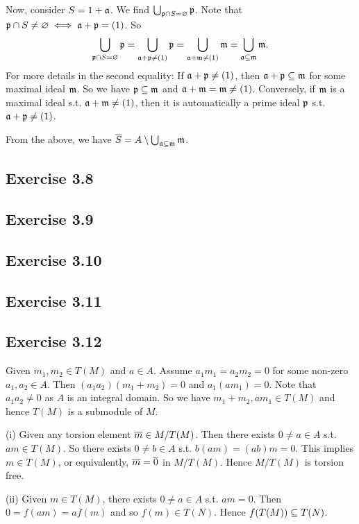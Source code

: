 \documentclass[../A&M.tex]{subfiles}
\begin{document}
Now, consider $S=1+\mathfrak{a}$. We find $\bigcup_{\mathfrak{p}\cap S=\varnothing} \mathfrak{p}$. Note that $\mathfrak{p} \cap S \neq \varnothing \iff \mathfrak{a}+\mathfrak{p}=(1)$. So
$$
\bigcup_{\mathfrak{p}\cap S=\varnothing} \mathfrak{p}
= \bigcup_{\mathfrak{a} + \mathfrak{p} \neq (1)} \mathfrak{p}
= \bigcup_{\mathfrak{a} + \mathfrak{m} \neq (1)} \mathfrak{m}
= \bigcup_{\mathfrak{a}\subseteq\mathfrak{m}} \mathfrak{m}.
$$
For more details in the second equality: If $\mathfrak{a} + \mathfrak{p} \neq (1)$, then $\mathfrak{a} + \mathfrak{p} \subseteq \mathfrak{m}$ for some maximal ideal $\mathfrak{m}$. So we have $\mathfrak{p} \subseteq \mathfrak{m}$ and $\mathfrak{a}+\mathfrak{m} = \mathfrak{m} \neq(1)$. Conversely, if $\mathfrak{m}$ is a maximal ideal s.t. $\mathfrak{a} + \mathfrak{m} \neq (1)$, then it is automatically a prime ideal $\mathfrak{p}$ s.t. $\mathfrak{a} + \mathfrak{p} \neq (1)$.

From the above, we have $\overline{S}=A \setminus \bigcup_{\mathfrak{a}\subseteq\mathfrak{m}} \mathfrak{m}$.

\subsection*{Exercise 3.8}

\subsection*{Exercise 3.9}

\subsection*{Exercise 3.10}

\subsection*{Exercise 3.11}

\subsection*{Exercise 3.12}

Given $m_1,m_2\in T(M)$ and $a \in A$. Assume $a_1m_1=a_2m_2=0$ for some non-zero $a_1,a_2\in A$. Then $(a_1a_2)(m_1+m_2)=0$ and $a_1(am_1) = 0$. Note that $a_1a_2\neq 0$ as $A$ is an integral domain. So we have $m_1+m_2,am_1 \in T(M)$ and hence $T(M)$ is a submodule of $M$.

(i) Given any torsion element $\overline{m} \in M/T(M)$. Then there exists $0\neq a\in A$ s.t. $am \in T(M)$. So there exists $0\neq b\in A$ s.t. $b(am) = (ab)m = 0$. This implies $m \in T(M)$, or equivalently, $\overline{m} = \overline{0}$ in $M/T(M)$. Hence $M/T(M)$ is torsion free.

(ii) Given $m\in T(M)$, there exists $0\neq a\in A$ s.t. $am=0$. Then $0=f(am)=af(m)$ and so $f(m) \in T(N)$. Hence $f(T(M)) \subseteq T(N)$.
\end{document}
